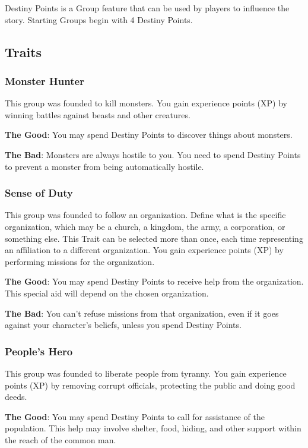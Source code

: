 \begin{multicols}{2}
\begin{enumerate}
Destiny Points is a Group feature that can be used by players to influence the story. Starting Groups begin with 4 Destiny Points.
\end{enumerate}
\subsection{Traits}\label{subsec:traits}
\subsubsection{Monster Hunter}
This group was founded to kill monsters. You gain experience points (XP) by winning battles against beasts and other creatures.

\textbf{The Good}: You may spend Destiny Points to discover things about monsters.

\textbf{The Bad}: Monsters are always hostile to you. You need to spend Destiny Points to prevent a monster from being automatically hostile.

\subsubsection{Sense of Duty}
This group was founded to follow an organization. Define what is the specific organization, which may be a church, a kingdom, the army, a corporation, or something else. This Trait can be selected more than once, each time representing an affiliation to a different organization. You gain experience points (XP) by performing missions for the organization.

\textbf{The Good}: You may spend Destiny Points to receive help from the organization. This special aid will depend on the chosen organization.

\textbf{The Bad}: You can’t refuse missions from that organization, even if it goes against your character’s beliefs, unless you spend Destiny Points.

\subsubsection{People’s Hero}
This group was founded to liberate people from tyranny. You gain experience points (XP) by removing corrupt officials, protecting the public and doing good deeds.

\textbf{The Good}: You may spend Destiny Points to call for assistance of the population. This help may involve shelter, food, hiding, and other support within the reach of the common man.


\end{multicols}
